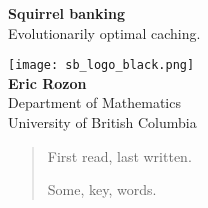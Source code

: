 \documentclass[titlepage, hidelinks, 12pt]{article}
\theoremstyle{plain}
\theoremstyle{remark}
\theoremstyle{definition}
\begin{document}
\begin{singlespace}
\begin{titlepage}
   \begin{center}
       \vspace*{1cm}
\Huge
       \textbf{Squirrel banking} \\
\Large
       \vspace{0.5cm}
       Evolutionarily optimal caching. 
      
            
       \vspace{4.1cm}
       \texttt{[image: sb\_logo\_black.png]} \\
       \vspace*{\fill}
       \textbf{Eric Rozon} \\

            
       Department of Mathematics\\
       University of British Columbia
            
   \end{center}
\end{titlepage}





\begin{abstract}

    First read, last written. 
    \bigskip

    \begin{keywords}
    Some, key, words. 
    \end{keywords}

\end{abstract}

\newpage

\tableofcontents

\newpage

%
\end{singlespace}
\end{document}
